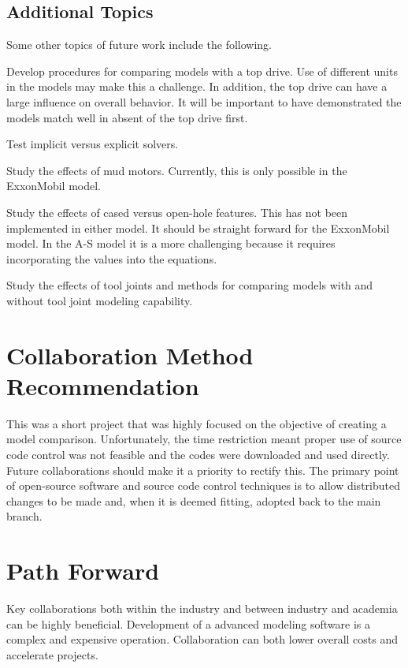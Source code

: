 \subsection{Additional Topics}
Some other topics of future work include the following.
\begin{bulletedlist}
    \item Develop procedures for comparing models with a top drive.  Use of different units in the models may make this a challenge.  In addition, the top drive can have a large influence on overall behavior.  It will be important to have demonstrated the models match well in absent of the top drive first.
	\item Test implicit versus explicit solvers.
	\item Study the effects of mud motors.  Currently, this is only possible in the ExxonMobil model.
    \item Study the effects of cased versus open-hole features.  This has not been implemented in either model.  It should be straight forward for the ExxonMobil model.  In the A-S model it is a more challenging because it requires incorporating the values into the equations.
    \item Study the effects of tool joints and methods for comparing models with and without tool joint modeling capability.
\end{bulletedlist}

\section{Collaboration Method Recommendation}
This was a short project that was highly focused on the objective of creating a model comparison.  Unfortunately, the time restriction meant proper use of source code control was not feasible and the codes were downloaded and used directly.  Future collaborations should make it a priority to rectify this.  The primary point of open-source software and source code control techniques is to allow distributed changes to be made and, when it is deemed fitting, adopted back to the main branch.

\section{Path Forward}
Key collaborations both within the industry and between industry and academia can be highly beneficial.  Development of a advanced modeling software is a complex and expensive operation.  Collaboration can both lower overall costs and accelerate projects.

